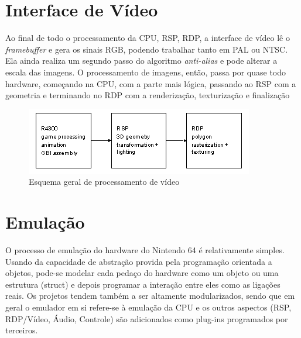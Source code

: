 \documentclass[12pt]{article}
\begin{document}
\section{Interface de Vídeo}
Ao final de todo o processamento da CPU, RSP, RDP, a interface de vídeo lê o \textit{framebuffer} e gera os sinais RGB, podendo trabalhar tanto em PAL ou NTSC. Ela ainda realiza um segundo passo do algoritmo \textit{anti-alias} e pode alterar a escala das imagens.
O processamento de imagens, então, passa por quase todo hardware, começando na CPU, com a parte mais lógica, passando ao RSP com a geometria e terminando no RDP com a renderização, texturização e finalização

\begin{figure}[H]
    \centering
        \includegraphics{figures/Video_pipeline}
    \caption{Esquema geral de processamento de vídeo}
\end{figure}

\section{Emulação}
O processo de emulação do hardware do Nintendo 64 é relativamente simples.
 Usando da capacidade de abstração provida pela programação orientada a objetos, pode-se modelar cada pedaço do hardware como um objeto ou uma estrutura (struct) e depois programar a interação entre eles como as ligações reais. Os projetos tendem também a ser altamente modularizados, sendo que em geral o emulador em si refere-se à emulação da CPU e os outros aspectos (RSP, RDP/Vídeo, Áudio, Controle) são adicionados como plug-ins programados por terceiros. 
 
\end{document}
